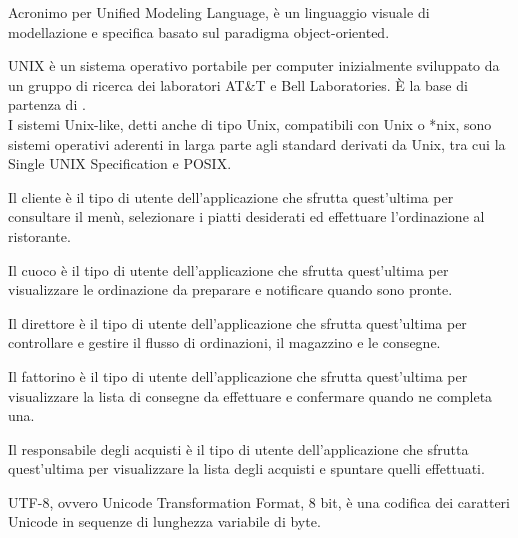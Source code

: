 Acronimo per Unified Modeling Language, è un linguaggio visuale di modellazione e specifica basato sul paradigma object-oriented.

UNIX è un sistema operativo portabile per computer inizialmente sviluppato da un gruppo di ricerca dei laboratori AT\&T e Bell Laboratories. \`{E} la base di partenza di .\\
I sistemi Unix-like, detti anche di tipo Unix, compatibili con Unix o *nix, sono sistemi operativi aderenti in larga parte agli standard derivati da Unix, tra cui la Single UNIX Specification e POSIX.

Il cliente è il tipo di utente dell’applicazione che sfrutta quest’ultima per consultare il menù, selezionare i piatti desiderati ed effettuare l’ordinazione al ristorante.

Il cuoco è il tipo di utente dell’applicazione che sfrutta quest’ultima per visualizzare le ordinazione da preparare e notificare quando sono pronte.

Il direttore è il tipo di utente dell’applicazione che sfrutta quest’ultima per controllare e gestire il flusso di ordinazioni, il magazzino e le consegne.

Il fattorino è il tipo di utente dell’applicazione che sfrutta quest’ultima per visualizzare la lista di consegne da effettuare e confermare quando ne completa una.

Il responsabile degli acquisti è il tipo di utente dell’applicazione che sfrutta quest’ultima per visualizzare la lista degli acquisti e spuntare quelli effettuati.

UTF-8, ovvero Unicode Transformation Format, 8 bit, è una codifica dei caratteri Unicode in sequenze di lunghezza variabile di byte.
\clearpage